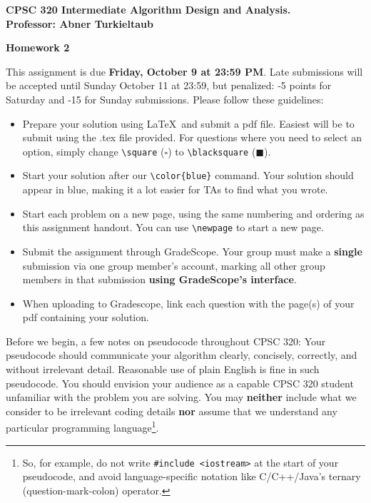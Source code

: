 \documentclass[letterpaper,11pt]{article}
\theoremstyle{plain}
\theoremstyle{definition}
\begin{document}

\begin{minipage}{11.5 cm}
\begin{flushleft}
\hspace*{-0.6cm}\textbf{CPSC 320 Intermediate Algorithm Design and Analysis.}\\
\hspace*{-0.6cm}\textbf{Professor: Abner Turkieltaub}
\end{flushleft}\end{minipage}

\begin{center}
	\LARGE \bf{Homework 2}\\
\end{center}

	This assignment is due \textbf{Friday, October 9 at 23:59 PM}. Late submissions will be accepted until Sunday October 11 at 23:59, but penalized: -5 points for Saturday and -15 for Sunday submissions. Please follow these guidelines:
	\begin{itemize}
		\item Prepare your solution using \LaTeX ~and submit a pdf file. Easiest will be to submit using
		the .tex file provided. For questions where you need to select an option, simply change \verb~\square~ ($\square$) to \verb~\blacksquare~ ($\blacksquare$).
		\item Start your solution after our \verb~\color{blue}~ command. Your solution should appear in blue, making it a lot easier for TAs to find what you wrote.
		\item Start each problem on a new page, using the same numbering and ordering as this assignment handout.
		You can use \verb~\newpage~ to start a new page.
		\item Submit the assignment through GradeScope. Your group must make  a \textbf{single} submission via one
		group member's account, marking all other group members in that submission \textbf{using GradeScope's interface}.
		\item  When uploading to Gradescope, link each question with the page(s) of your pdf containing your solution.
	\end{itemize}
	
	Before we begin, a few notes on pseudocode throughout CPSC 320: Your pseudocode should
	communicate your algorithm clearly, concisely, correctly, and without irrelevant detail.
	Reasonable use of plain English is fine in such pseudocode. You should envision your
	audience as a capable CPSC 320 student unfamiliar with the problem you are solving. You may \textbf{neither} include what we consider to be irrelevant coding details \textbf{nor} assume that we understand any particular programming language\footnote{So, for example, do not write \texttt{\#include <iostream>} at the start of your pseudocode, and avoid language-specific notation like C/C++/Java's ternary
	(question-mark-colon) operator.}.\\
	
\end{document}
